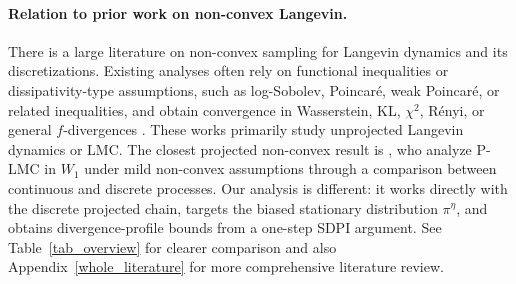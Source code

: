 \documentclass[10pt, journal]{IEEEtran}
\begin{document}
\paragraph{Relation to prior work on non-convex Langevin.}
There is a large literature on non-convex sampling for Langevin dynamics and its discretizations. Existing analyses often rely on functional inequalities or dissipativity-type assumptions, such as log-Sobolev, Poincar\'e, weak Poincar\'e, or related inequalities, and obtain convergence in Wasserstein, KL, $\chi^2$, R\'enyi, or general $f$-divergences \cite{raginsky2017non,vempala2019advances,erdogdu2021convergence,erdogdu2022chisquared,chewi2022analysis,Hosseini2023Towards,mitra2025fast}. These works primarily study unprojected Langevin dynamics or LMC. The closest projected non-convex result is \cite{lamperski2021projected}, who analyze P-LMC in $W_1$ under mild non-convex assumptions through a comparison between continuous and discrete processes. Our analysis is different: it works directly with the discrete projected chain, targets the biased stationary distribution $\pi^\eta$, and obtains divergence-profile bounds from a one-step SDPI argument. See Table~\ref{tab_overview} for clearer comparison and also Appendix~\ref{whole_literature} for more comprehensive literature review. 

\setlength{\tabcolsep}{2pt}
\end{document}
